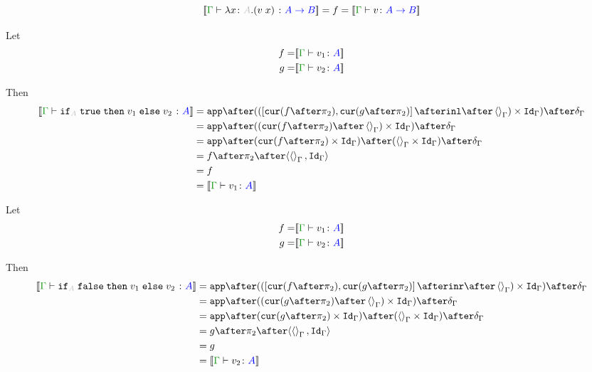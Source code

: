 \documentclass{report}
\begin{document}
\begin{equation}
    \deno{\gtyperelation{\lam{x}{A}{(\apply{v}{x})}}{\ab}} = f =\deno{\gtyperelation{v}{\ab}}
\end{equation}

Let
\begin{align*}
    f = &\deno{\gtyperelation{v_1}{ A}}\\
    g = &\deno{\gtyperelation{v_2}{ A}}\\
\end{align*}

Then
\begin{equation}
    \begin{split}
        \deno{\gtyperelation{\pifthenelse{A}{\t}{v_1}{v_2}}{ A}} & = \ifMorph{\inl\after\term{\G}}{f}{g} \\
        & = \app\after((\cur{f\after\pp}\after\term{\G})\times\idg)\after\diag{\G}\\
        & = \app\after(\cur{f\after\pp}\times\idg)\after(\term{\G}\times\idg)\after\diag{\G}\\
        & = f\after\pp\after\pr{\term{\G}}{\idg}\\
        & = f \\
        & = \deno{\gtyperelation{v_1}{ A}}\\
    \end{split}
\end{equation}


Let
\begin{align*}
    f = &\deno{\gtyperelation{v_1}{ A}}\\
    g = &\deno{\gtyperelation{v_2}{ A}}\\
\end{align*}

Then
\begin{equation}
    \begin{split}
        \deno{\gtyperelation{\pifthenelse{A}{\f}{v_1}{v_2}}{ A}} & = \ifMorph{\inr\after\term{\G}}{f}{g} \\
        & = \app\after((\cur{g\after\pp}\after\term{\G})\times\idg)\after\diag{\G}\\
        & = \app\after(\cur{g\after\pp}\times\idg)\after(\term{\G}\times\idg)\after\diag{\G}\\
        & = g\after\pp\after\pr{\term{\G}}{\idg}\\
        & = g \\
        & = \deno{\gtyperelation{v_2}{ A}}\\
    \end{split}
\end{equation}
\end{document}
